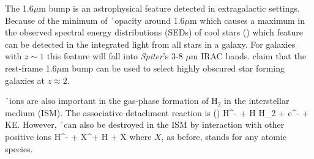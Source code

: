 The 1.6$\mu$m bump is an astrophysical feature detected in extragalactic settings.  Because of the minimum of \h\ opacity around 1.6$\mu$m which causes a maximum in the observed spectral energy distributions (SEDs) of cool stars (\citealt{sawicki2002}) which feature can be detected in the integrated light from all stars in a galaxy.  For galaxies with $z\sim1$ this feature will fall into {\it Spiter}'s 3-8 $\mu$m IRAC bands.  \cite{desai2009} claim that the rest-frame 1.6$\mu$m bump can be used to select highly obscured star forming galaxies at $z\approx 2$.  %

\h\ ions are also important in the gas-phase formation of H$_2$ in the
interstellar medium (ISM).  The associative detachment reaction is (\citealt{draine2010})
\beq
H^- + H \rightarrow H_2 + e^- + \textrm{KE}.
\eeq
However, \h\ can also be destroyed in the ISM by interaction with
other positive ions
\beq
H^- + X^+ \rightarrow H + X
\eeq
where $X$, as before, stands for any atomic species.
